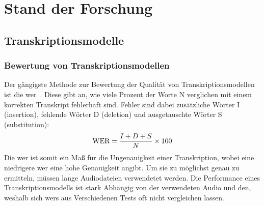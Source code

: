 \chapter{Stand der Forschung}\label{ch:relatedWork}




\section{Transkriptionsmodelle}
\subsection{Bewertung von Transkriptionsmodellen}
Der gängigste Methode zur Bewertung der Qualität von Transkriptionsmodellen ist die \ac{wer}~\citep{wer}.
Diese gibt an, wie viele Prozent der Worte N verglichen mit einem korrekten Transkript fehlerhaft sind.
Fehler sind dabei zusätzliche Wörter I (insertion), fehlende Wörter D (deletion) und ausgetauschte Wörter S (substitution):
\[\textnormal{WER} = \frac{I + D + S}{N} \times 100\]
Die \ac{wer} ist somit ein Maß für die Ungenauigkeit einer Transkription, wobei eine niedrigere \ac{wer} eine hohe Genauigkeit angibt.
Um sie zu möglichst genau zu ermitteln, müssen lange Audiodateien verwendetet werden.
Die Performance eines Transkriptionsmodells ist stark Abhängig von der verwendeten Audio und den, weshalb sich \acp{wer} aus Verschiedenen Tests oft nicht vergleichen lassen.


